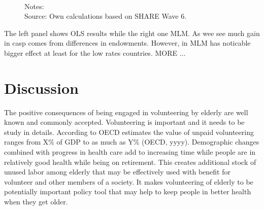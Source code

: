 \documentclass[10pt, letterpaper]{article}
\begin{document}
\begin{spacing}{1.4}
\begin{figure}[H]
\begin{minipage}{1\linewidth}
\quad
{} ~\\
{\footnotesize Notes: }~\\
{\footnotesize Source: Own calculations based on SHARE Wave 6.}
\end{minipage}
\end{figure}  
 
The left panel shows OLS results while the right one MLM. As wee see much gain in casp comes from differences in endowments. However, in MLM has noticable bigger effect at least for the low rates countries. MORE ... 
 
\section{Discussion}


The positive consequences of being engaged in volunteering by elderly are well known and commonly accepted. Volunteering is important and it needs to be study in details.  According to OECD estimates the value of unpaid volunteering ranges from X\% of GDP to as much as Y\% (OECD, yyyy).  Demographic changes combined with progress in health care add to increasing time while people are in relatively good health while being on retirement. This creates additional  stock of unused labor among elderly that may be effectively used with benefit for volunteer and other members of a society.  It makes   volunteering of elderly to be potentially important policy tool that may help to keep people in better health when they get older. \\



\end{spacing}
\end{document}
